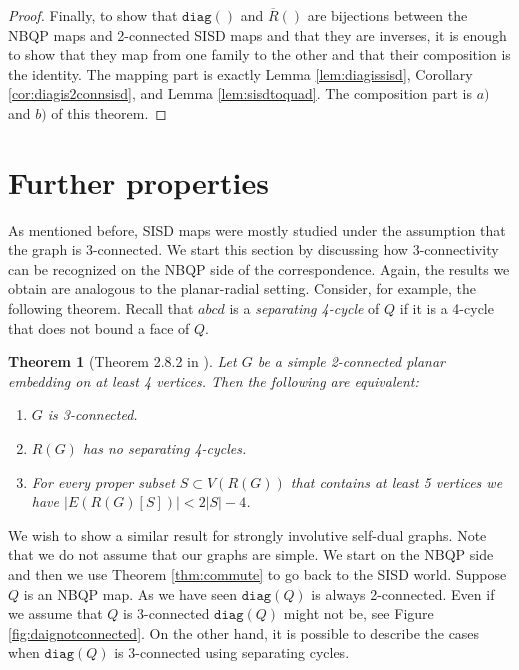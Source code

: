 \documentclass[10pt,a4paper]{article}
\newtheorem{theorem}{Theorem}[section]
\newcommand{\diag}[0]{\mathtt{diag}}
\begin{document}
\begin{proof}
 Finally, to show that $\diag()$ and $\overline{R}()$ are bijections between the NBQP maps and 2-connected SISD maps and that they are inverses, it is enough to show that they map from one family to the other and that their composition is the identity. The mapping part is exactly  Lemma \ref{lem:diagissisd}, Corollary \ref{cor:diagis2connsisd}, and Lemma \ref{lem:sisdtoquad}. The composition part is $a)$ and $b)$ of this theorem.
    

    
\end{proof}



\section{Further properties}\label{sec:applications}
As mentioned before, SISD maps were mostly studied under the assumption that the graph is 3-connected. We start this section by discussing how 3-connectivity can be recognized on the NBQP side of the correspondence. Again, the results we obtain are analogous to the planar-radial setting. Consider, for example, the following theorem. Recall that $abcd$ is a \emph{separating 4-cycle} of $Q$ if it is a 4-cycle that does not bound a face of $Q$. 

\begin{theorem}[Theorem 2.8.2 in \cite{mohar2001graphs}]\label{thm:radial3con}
    Let $G$ be a simple 2-connected planar embedding on at least 4 vertices. Then the following are equivalent:
    \begin{enumerate}
        \item $G$ is 3-connected. 
        \item $R(G)$ has no separating 4-cycles.
        \item For every proper subset $S\subset V(R(G))$ that contains at least 5 vertices we have $|E(R(G)[S])|<2|S|- 4$.
    \end{enumerate}
\end{theorem}

We wish to show a similar result for strongly involutive self-dual graphs. Note that we do not assume that our graphs are simple. We start on the NBQP side and then we use Theorem \ref{thm:commute} to go back to the SISD world. Suppose $Q$ is an NBQP map. As we have seen $\diag(Q)$ is always 2-connected. Even if we assume that $Q$ is 3-connected $\diag(Q)$ might not be, see Figure \ref{fig:daignotconnected}. On the other hand, it is possible to describe the cases when $\diag(Q)$ is 3-connected using separating cycles. 
\end{document}
